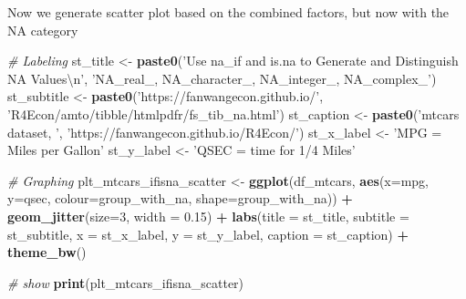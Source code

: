 \documentclass[
]{book}
\newenvironment{Shaded}{\begin{snugshade}}{\end{snugshade}}
\newcommand{\CharTok}[1]{\textcolor[rgb]{0.31,0.60,0.02}{#1}}
\newcommand{\CommentTok}[1]{\textcolor[rgb]{0.56,0.35,0.01}{\textit{#1}}}
\newcommand{\DataTypeTok}[1]{\textcolor[rgb]{0.13,0.29,0.53}{#1}}
\newcommand{\DecValTok}[1]{\textcolor[rgb]{0.00,0.00,0.81}{#1}}
\newcommand{\FloatTok}[1]{\textcolor[rgb]{0.00,0.00,0.81}{#1}}
\newcommand{\KeywordTok}[1]{\textcolor[rgb]{0.13,0.29,0.53}{\textbf{#1}}}
\newcommand{\NormalTok}[1]{#1}
\newcommand{\OperatorTok}[1]{\textcolor[rgb]{0.81,0.36,0.00}{\textbf{#1}}}
\newcommand{\StringTok}[1]{\textcolor[rgb]{0.31,0.60,0.02}{#1}}
\begin{document}
\begin{Shaded}
\end{Shaded}

Now we generate scatter plot based on the combined factors, but now with the NA category

\begin{Shaded}
\begin{Highlighting}[]
\CommentTok{# Labeling}
\NormalTok{st_title <-}\StringTok{ }\KeywordTok{paste0}\NormalTok{(}\StringTok{'Use na_if and is.na to Generate and Distinguish NA Values}\CharTok{\textbackslash{}n}\StringTok{'}\NormalTok{,}
                   \StringTok{'NA_real_, NA_character_, NA_integer_, NA_complex_'}\NormalTok{)}
\NormalTok{st_subtitle <-}\StringTok{ }\KeywordTok{paste0}\NormalTok{(}\StringTok{'https://fanwangecon.github.io/'}\NormalTok{,}
                      \StringTok{'R4Econ/amto/tibble/htmlpdfr/fs_tib_na.html'}\NormalTok{)}
\NormalTok{st_caption <-}\StringTok{ }\KeywordTok{paste0}\NormalTok{(}\StringTok{'mtcars dataset, '}\NormalTok{,}
                     \StringTok{'https://fanwangecon.github.io/R4Econ/'}\NormalTok{)}
\NormalTok{st_x_label <-}\StringTok{ 'MPG = Miles per Gallon'}
\NormalTok{st_y_label <-}\StringTok{ 'QSEC = time for 1/4 Miles'}

\CommentTok{# Graphing}
\NormalTok{plt_mtcars_ifisna_scatter <-}\StringTok{ }
\StringTok{  }\KeywordTok{ggplot}\NormalTok{(df_mtcars, }
         \KeywordTok{aes}\NormalTok{(}\DataTypeTok{x=}\NormalTok{mpg, }\DataTypeTok{y=}\NormalTok{qsec, }
             \DataTypeTok{colour=}\NormalTok{group_with_na, }
             \DataTypeTok{shape=}\NormalTok{group_with_na)) }\OperatorTok{+}
\StringTok{  }\KeywordTok{geom_jitter}\NormalTok{(}\DataTypeTok{size=}\DecValTok{3}\NormalTok{, }\DataTypeTok{width =} \FloatTok{0.15}\NormalTok{) }\OperatorTok{+}
\StringTok{  }\KeywordTok{labs}\NormalTok{(}\DataTypeTok{title =}\NormalTok{ st_title, }\DataTypeTok{subtitle =}\NormalTok{ st_subtitle,}
       \DataTypeTok{x =}\NormalTok{ st_x_label, }\DataTypeTok{y =}\NormalTok{ st_y_label, }\DataTypeTok{caption =}\NormalTok{ st_caption) }\OperatorTok{+}
\StringTok{  }\KeywordTok{theme_bw}\NormalTok{()}

\CommentTok{# show}
\KeywordTok{print}\NormalTok{(plt_mtcars_ifisna_scatter)}
\end{Highlighting}
\end{Shaded}
\end{document}
